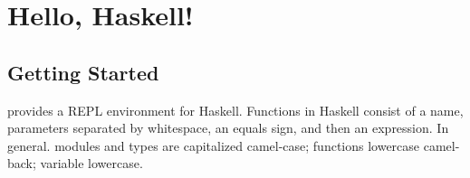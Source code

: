 \documentclass{article}
\begin{document}
\section{Hello, Haskell!}

\subsection{Getting Started}

 provides a REPL environment for Haskell. Functions in Haskell consist of a name, parameters separated by whitespace, an equals sign, and then an expression. In general. modules and types are capitalized camel-case; functions lowercase camel-back; variable lowercase.

\printindex
\end{document}

